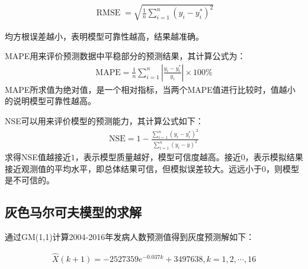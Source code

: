 \documentclass{whutmod}
\begin{document}
	    \begin{gather*}
	   \operatorname{RMSE}=\sqrt{\frac{1}{n} \sum_{i=1}^{n}\left(y_{i}-y_{i}^{*}\right)^{2}}
	   \end{gather*}
	   

	   均方根误差越小，表明模型可靠性越高，结果越准确。
	    
	     MAPE用来评价预测数据中平稳部分的预测结果，其计算公式为：
	    \begin{gather*}
\mathrm{MAPE}=\frac{1}{n} \sum_{i=1}^{n}\left|\frac{y_{i}-y_{i}^{*}}{y_{i}}\right| \times 100 \%
	     \end{gather*}
	     MAPE所求值为绝对值，是一个相对指标，当两个MAPE值进行比较时，值越小的说明模型可靠性越高。
	     
	       NSE可以用来评价模型的预测能力，其计算公式如下：
	       	\begin{gather*}
\mathrm{NSE}=1-\frac{\sum_{i=1}^{n}\left(y_{i}-y_{i}^{*}\right)^{2}}{\sum_{i=1}^{n}\left(y_{i}-\overline{y}\right)^{2}}       
	       \end{gather*}
	       求得NSE值越接近$1$，表示模型质量越好，模型可信度越高。接近$0$，表示模拟结果接近观测值的平均水平，即总体结果可信，但模拟误差较大。远远小于$0$，则模型是不可信的。
	      
	 
	         
	\subsection{灰色马尔可夫模型的求解}   
	  通过GM(1,1)计算2004-2016年发病人数预测值得到灰度预测解如下：


	  	  \begin{gather}
	  \widehat{X}(k+1)=-2527359e^{-0.037k}+3497638,k=1,2,\cdots,16
	  \end{gather}
\end{document}
